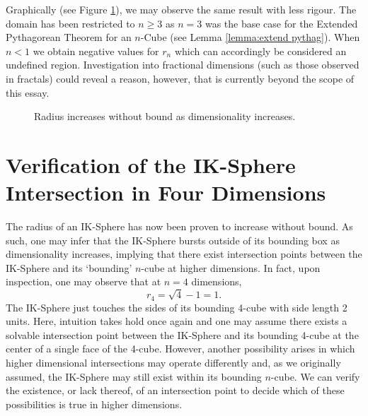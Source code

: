 Graphically (see Figure \ref{fig:radius increases graph}), we may observe the same result with less rigour. The domain has been restricted to $n\geq3$ as $n=3$ was the base case for the Extended Pythagorean Theorem for an $n$-Cube (see Lemma \ref{lemma:extend pythag}). When $n<1$ we obtain negative values for $r_n$ which can accordingly be considered an undefined region. Investigation into fractional dimensions (such as those observed in fractals) could reveal a reason, however, that is currently beyond the scope of this essay.
\begin{figure}[H]
    \centering
    \caption{Radius increases without bound as dimensionality increases.}
    \label{fig:radius increases graph}
\end{figure}






\section{Verification of the IK-Sphere Intersection in Four Dimensions}\label{section:verify intersection}
The radius of an IK-Sphere has now been proven to increase without bound. As such, one may infer that the IK-Sphere bursts outside of its bounding box as dimensionality increases, implying that there exist intersection points between the IK-Sphere and its `bounding' $n$-cube at higher dimensions. In fact, upon inspection, one may observe that at $n=4$ dimensions, $$r_4=\sqrt{4}-1=1.$$ The IK-Sphere just touches the sides of its bounding 4-cube with side length 2 units. Here, intuition takes hold once again and one may assume there exists a solvable intersection point between the IK-Sphere and its bounding 4-cube at the center of a single face of the 4-cube. However, another possibility arises in which higher dimensional intersections may operate differently and, as we originally assumed, the IK-Sphere may still exist within its bounding $n$-cube. We can verify the existence, or lack thereof, of an intersection point to decide which of these possibilities is true in higher dimensions.

